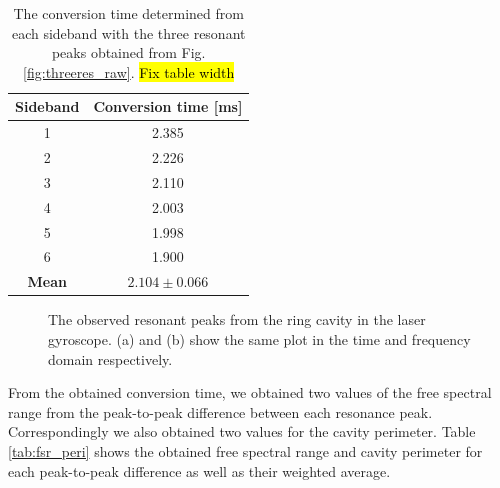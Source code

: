 \documentclass[a4paper]{report}
\numberwithin{equation}{section}
\begin{document}
\begin{table}[h!]
	\centering
	\begin{tabular}{|c|c|}
		\hline 
		Sideband & Conversion time [ms] \\ \hline
		1 & 2.385 \\ \hline
		2 & 2.226 \\ \hline
		3 & 2.110 \\ \hline
		4 & 2.003 \\ \hline
		5 & 1.998 \\ \hline
		6 & 1.900 \\ \hline
		\textbf{Mean} & \textbf{$2.104 \pm 0.066$} \\ \hline
	\end{tabular}
	\caption{The conversion time determined from each sideband with the three resonant peaks obtained from Fig. \ref{fig:threeres_raw}.
	\hl{Fix table width}}
	\label{tab:mod_times}
\end{table}


\begin{figure}[h!]
	\centering
	\quad
	\centering
	\caption{The observed resonant peaks from the ring cavity in the laser gyroscope. (a) and (b) show the 
	same plot in the time and frequency domain respectively.}
	\label{fig:res_peaks}
\end{figure}

From the obtained conversion time, we obtained two values of the free spectral range from the peak-to-peak difference
between each resonance peak. Correspondingly we also obtained two values for the cavity perimeter. Table \ref{tab:fsr_peri} shows the 
obtained free spectral range and cavity perimeter for each peak-to-peak difference as well as their weighted average.
\end{document}
